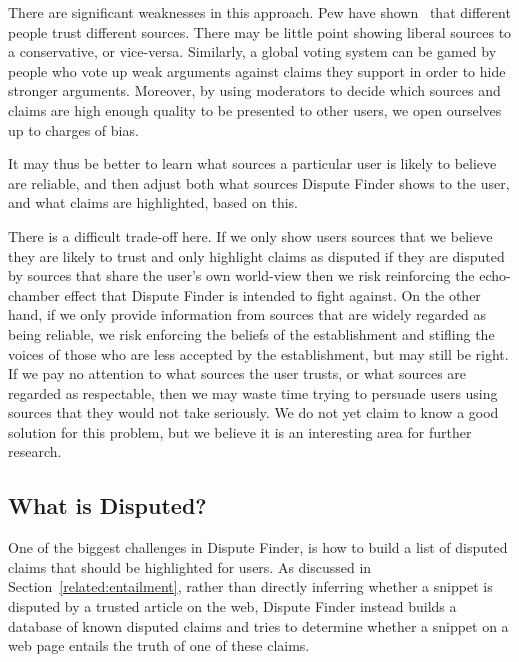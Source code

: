 \documentclass{www2010-submission}
\newcommand{\todo}[1]{}
\begin{document}
\todo{study result: verify}
There are significant weaknesses in this approach. Pew have shown~\cite{pew-news} that different people trust different sources. There may be little point showing liberal sources to a conservative, or vice-versa. Similarly, a global voting system can be gamed by people who vote up weak arguments against claims they support in order to hide stronger arguments. Moreover, by using moderators to decide which sources and claims are high enough quality to be presented to other users, we open ourselves up to charges of bias.

It may thus be better to learn what sources a particular user is likely to believe are reliable, and then adjust both what sources Dispute Finder shows to the user, and what claims are highlighted, based on this.

There is a difficult trade-off here. If we only show users sources that we believe they are likely to trust and only highlight claims as disputed if they are disputed by sources that share the user's own world-view then we risk reinforcing the echo-chamber effect that Dispute Finder is intended to fight against. On the other hand, if we only provide information from sources that are widely regarded as being reliable, we risk enforcing the beliefs of the establishment and stifling the voices of those who are less accepted by the establishment, but may still be right. If we pay no attention to what sources the user trusts, or what sources are regarded as respectable, then we may waste time trying to persuade users using sources that they would not take seriously. We do not yet claim to know a good solution for this problem, but we believe it is an interesting area for further research.

\todo{Cite Pew Research study saying people like to read news that supports their own point of view, but many others like neutral sources. http://people-press.org/report/?pageid=1353}


\subsection{What is Disputed?}

One of the biggest challenges in Dispute Finder, is how to build a list of disputed claims that should be highlighted for users. As discussed in Section~\ref{related:entailment}, rather than directly inferring whether a snippet is disputed by a trusted article on the web, Dispute Finder instead builds a database of known disputed claims and tries to determine whether a snippet on a web page entails the truth of one of these claims.
\end{document}
